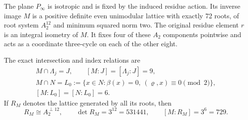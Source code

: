\begin{theorem}
\label{esrf:thm:fourth-extension}
The plane $P_\infty$ is isotropic and is fixed by the induced
residue action. Its inverse image $M$ is a positive definite
even unimodular lattice with exactly 72 roots, of root system
$A_2^{12}$ and minimum squared norm two.
The original residue element $r$ is an integral isometry of $M$.
It fixes four of these $A_2$ components pointwise and acts as
a coordinate three-cycle on each of the other eight.

The exact intersection and index relations are
\[
 \begin{gathered}
 M\cap\Lambda_j=J,\qquad [M:J]=[\Lambda_j:J]=9,\\
 M\cap N=L_0:=\{x\in N:\beta(x)=0,\
                                (\varrho,x)\equiv0\pmod2\},\\
 [M:L_0]=[N:L_0]=6.
 \end{gathered}
 \tag{RF33}
\]
If $R_M$ denotes the lattice generated by all its roots, then
\[
 R_M\cong A_2^{\perp12},\qquad
 \det R_M=3^{12}=531441,\qquad[M:R_M]=3^6=729.
 \tag{RF34}
\]
\end{theorem}

